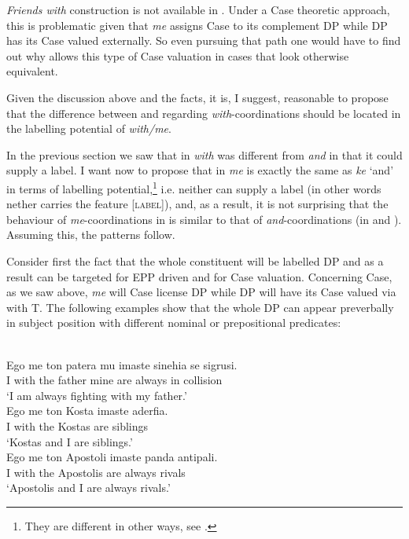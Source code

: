 \documentclass[output=paper]{langsci/langscibook}
\begin{document}
\emph{Friends with} construction is not available in . Under a Case
theoretic approach, this is problematic given that \emph{me} assigns Case to
its complement DP while DP has its Case valued externally. So even
pursuing that path one would have to find out why  allows this type
of Case valuation in cases that look otherwise equivalent.

Given the discussion above and the  facts, it is, I suggest,
reasonable to propose that the difference between  and  regarding
\emph{with}-coordinations should be located in the labelling potential of
\emph{with/me}.

In the previous section we saw that in  \emph{with} was different
from \emph{and} in that it could supply a label. I want now to propose that in
 \emph{me} is exactly the same as \emph{ke} \enquote*{and} in terms
of labelling potential,\footnote{They are different in other
    ways, see .} i.e. neither can supply a label (in other words
    nether carries the feature [\textsc{label}]), and, as a result, it is not surprising
    that the behaviour of \emph{me}-coordinations in  is similar to
    that of \emph{and}-coordinations (in  and
    ).  Assuming this, the patterns follow.

Consider first the fact that the whole constituent will be labelled DP and as a
result can be targeted for \gls{EPP} driven  and for Case valuation.  Concerning Case, as
we saw above, \emph{me} will Case license DP while DP will have
its Case valued via  with T. The following examples show that the
whole DP can appear preverbally in subject position with different nominal or
prepositional predicates:

\ea\label{ex:29.30} \\
    \gll    Ego me ton patera mu imaste sinehia se sigrusi.\\
            I with the father mine are always in collision\\
    \glt    \enquote*{I am always fighting with my father.}
\ex\label{ex:29.31} \\
	\gll    Ego me ton Kosta imaste aderfia.\\
            I with the Kostas are siblings\\
    \glt    \enquote*{Kostas and I are siblings.}
\ex\label{ex:29.32} \\
	\gll    Ego me ton Apostoli imaste panda antipali.\\
            I with the Apostolis are always rivals\\
    \glt    \enquote*{Apostolis and I are always rivals.}
\z
\end{document}

